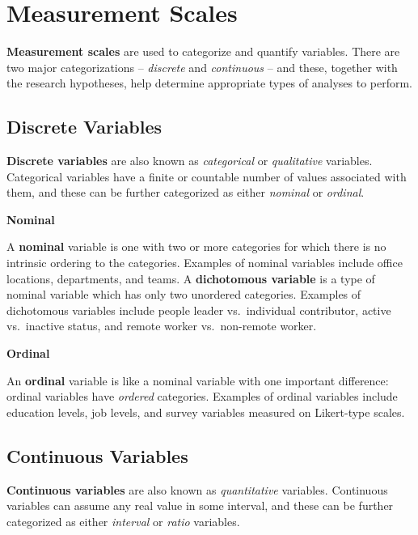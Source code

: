 \documentclass[
]{book}
\begin{document}
\hypertarget{measurement-scales}{%
\section{Measurement Scales}\label{measurement-scales}}

\textbf{Measurement scales} are used to categorize and quantify variables. There are two major categorizations -- \emph{discrete} and \emph{continuous} -- and these, together with the research hypotheses, help determine appropriate types of analyses to perform.

\hypertarget{discrete-variables}{%
\subsection{Discrete Variables}\label{discrete-variables}}

\textbf{Discrete variables} are also known as \emph{categorical} or \emph{qualitative} variables. Categorical variables have a finite or countable number of values associated with them, and these can be further categorized as either \emph{nominal} or \emph{ordinal}.

\textbf{Nominal}

A \textbf{nominal} variable is one with two or more categories for which there is no intrinsic ordering to the categories. Examples of nominal variables include office locations, departments, and teams. A \textbf{dichotomous variable} is a type of nominal variable which has only two unordered categories. Examples of dichotomous variables include people leader vs.~individual contributor, active vs.~inactive status, and remote worker vs.~non-remote worker.

\textbf{Ordinal}

An \textbf{ordinal} variable is like a nominal variable with one important difference: ordinal variables have \emph{ordered} categories. Examples of ordinal variables include education levels, job levels, and survey variables measured on Likert-type scales.

\hypertarget{continuous-variables}{%
\subsection{Continuous Variables}\label{continuous-variables}}

\textbf{Continuous variables} are also known as \emph{quantitative} variables. Continuous variables can assume any real value in some interval, and these can be further categorized as either \emph{interval} or \emph{ratio} variables.
\end{document}
